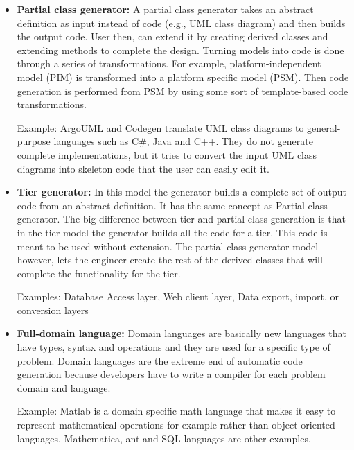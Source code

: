 \begin{itemize}
\item \textbf{Partial class generator:} A partial class generator takes an abstract definition as input instead of code (e.g., UML class diagram) and then builds the output code. User then, can extend it by creating derived classes and extending methods to complete the design. Turning models into code is done through a series of transformations. For example, platform-independent model (PIM) is transformed into a platform specific model (PSM). Then code generation is performed from PSM by using some sort of template-based code transformations.

Example: ArgoUML and Codegen translate UML class diagrams to general-purpose languages such as C\#, Java and C++. They do not generate complete implementations, but it tries to convert the input UML class diagrams into skeleton code that the user can easily edit it. 

\item \textbf{Tier generator:} In this model the generator builds a complete set of output code from an abstract definition. It has the same concept as Partial class generator. The big difference between tier and partial class generation is that in the tier model the generator builds all the code for a tier. This code is meant to be used without extension. The partial-class generator model however, lets the engineer create the rest of the derived classes that will complete the functionality for the tier.

Examples: Database Access layer, Web client layer, Data export, import, or conversion layers

\item \textbf{Full-domain language:} Domain languages are basically new languages that have types, syntax and operations and they are used for a specific type of problem. 
Domain languages are the extreme end of automatic code generation because developers have to write a compiler for each problem domain and language. 

Example: Matlab is a domain specific math language that makes it easy to represent mathematical operations for example rather than object-oriented languages. Mathematica, ant and SQL languages are other examples.

\end{itemize}
